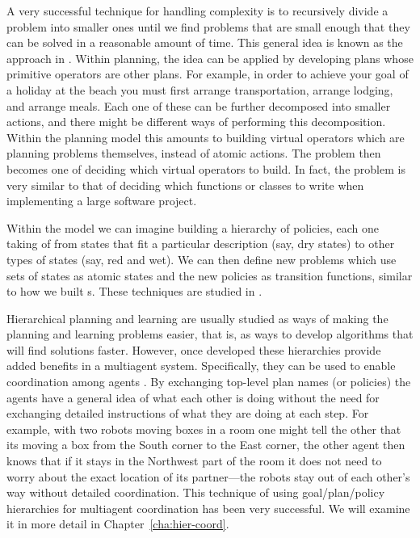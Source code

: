 A very successful technique for handling complexity is to recursively
divide a problem into smaller ones until we find problems that are
small enough that they can be solved in a reasonable amount of time.
This general idea is known as the  approach in
. Within planning, the idea can be applied by developing
plans whose primitive operators are other plans. For example, in order
to achieve your goal of a holiday at the beach you must first arrange
transportation, arrange lodging, and arrange meals. Each one of these
can be further decomposed into smaller actions, and there might be
different ways of performing this decomposition. Within the planning
model this amounts to building virtual operators which are planning
problems themselves, instead of atomic actions. The problem then
becomes one of deciding which virtual operators to build. In fact, the
problem is very similar to that of deciding which functions or classes
to write when implementing a large software project.

Within the  model we can imagine building a hierarchy of policies,
each one taking of from states that fit a particular description (say,
dry states) to other types of states (say, red and wet). We can then
define new  problems which use sets of states as atomic states and
the new policies as transition functions, similar to how we built
s. These techniques are studied in .

Hierarchical planning and learning are usually studied as ways of
making the planning and learning problems easier, that is, as ways to
develop algorithms that will find solutions faster. However, once
developed these hierarchies provide added benefits in a multiagent
system. Specifically, they can be used to enable coordination among
agents \cite{durfee99b}. By exchanging top-level plan names (or
policies) the agents have a general idea of what each other is doing
without the need for exchanging detailed instructions of what they are
doing at each step. For example, with two robots moving boxes in a
room one might tell the other that its moving a box from the South
corner to the East corner, the other agent then knows that if it stays
in the Northwest part of the room it does not need to worry about the
exact location of its partner---the robots stay out of each other's
way without detailed coordination. This technique of using
goal/plan/policy hierarchies for multiagent coordination has been very
successful. We will examine it in more detail in
Chapter~\ref{cha:hier-coord}.

